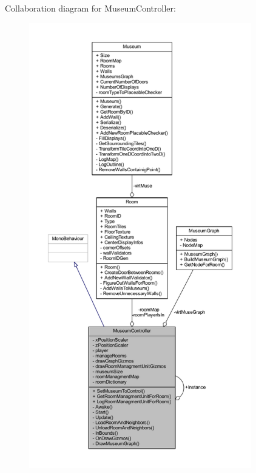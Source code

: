 Collaboration diagram for Museum\+Controller\+:
\nopagebreak
\begin{figure}[H]
\begin{center}
\leavevmode
\includegraphics[height=550pt]{class_museum_controller__coll__graph}
\end{center}
\end{figure}
